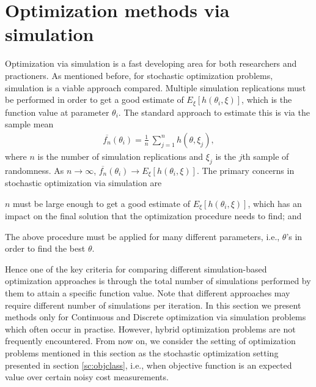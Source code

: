 \section{Optimization methods via simulation }\label{sc:dis}
Optimization via simulation is a fast developing area for both researchers and practioners. As mentioned before, for stochastic optimization problems, simulation is a viable approach compared. Multiple simulation replications must be performed in order to get a good estimate of $E_{\xi}[h(\theta_i,\xi)]$, which is the function value at parameter $\theta_i$. The standard approach to estimate this is via the sample mean
\begin{align}\label{eq:sm}
\overline {f_n} (\theta_i) = \frac{1}{n} ~  \sum_{j=1}^{n} h(\theta,\xi_j),
\end{align}
where $n$ is the number of simulation replications and $\xi_j$ is the $j$th sample of randomness. As $n \to \infty$, $\overline{ f_n} (\theta_i) \to E_{\xi}[h(\theta_i,\xi)]$. The primary concerns in stochastic optimization via simulation are 
\begin{inparaenum}[\bfseries (i)]
	\item $n$ must be large enough to get a good estimate of  $E_{\xi}[h(\theta_i,\xi)]$, which has an impact on the final solution that the optimization procedure needs to find; and
	\item The above procedure must be applied for many different parameters, i.e., $\theta$'s in order to find the best $\theta$.
\end{inparaenum}
Hence one of the key criteria for comparing different simulation-based optimization approaches is through the total number of simulations performed by them to attain a specific function value. Note that different approaches may require different number of simulations per  iteration. In this section we present methods only for Continuous and Discrete optimization via simulation problems which often occur in practise. However, hybrid optimization problems are not frequently encountered. From  now on, we consider the setting of optimization problems mentioned in this section as the stochastic optimization setting presented in section \ref{sc:objclass}, i.e., when objective function is an expected value over certain noisy cost measurements. 
